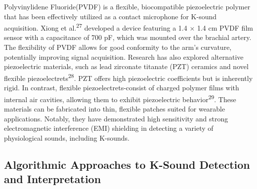 \documentclass[
  12pt,
  letterpaper,
  openany,
  oneside]{book}
\begin{document}
Polyvinylidene Fluoride(PVDF) is a flexible, biocompatible piezoelectric
polymer that has been effectively utilized as a contact microphone for
K-sound acquisition. Xiong et al.\textsuperscript{27} developed a device
featuring a 1.4 × 1.4 cm PVDF film sensor with a capacitance of 700 pF,
which was mounted over the brachial artery. The flexibility of PVDF
allows for good conformity to the arm's curvature, potentially improving
signal acquisition. Research has also explored alternative piezoelectric
materials, such as lead zirconate titanate (PZT) ceramics and novel
flexible piezoelectrets\textsuperscript{28}. PZT offers high
piezoelectric coefficients but is inherently rigid. In contrast,
flexible piezoelectrets-consist of charged polymer films with internal
air cavities, allowing them to exhibit piezoelectric
behavior\textsuperscript{29}. These materials can be fabricated into
thin, flexible patches suited for wearable applications. Notably, they
have demonstrated high sensitivity and strong electromagnetic
interference (EMI) shielding in detecting a variety of physiological
sounds, including K-sounds.

\subsection{Algorithmic Approaches to K-Sound Detection and
Interpretation}\label{algorithmic-approaches-to-k-sound-detection-and-interpretation}
\end{document}
